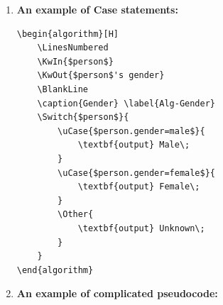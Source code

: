\documentclass[12pt,a4paper]{article}
\begin{document}
\begin{enumerate}
\begin{minipage}[t]{0.4\textwidth}
\begin{algorithm}[H]
                \textbf{output} $gcd$\;
            \end{algorithm}
        \end{minipage}

    \item {\color{blue}\textbf{An example of Case statements:}}

        \begin{minipage}[t]{0.5\textwidth}
\begin{verbatim}
\begin{algorithm}[H]
    \LinesNumbered
    \KwIn{$person$}
    \KwOut{$person$'s gender}
    \BlankLine
    \caption{Gender} \label{Alg-Gender}
    \Switch{$person$}{
        \uCase{$person.gender=male$}{
            \textbf{output} Male\;
        }
        \uCase{$person.gender=female$}{
            \textbf{output} Female\;
        }
        \Other{
            \textbf{output} Unknown\;
        }
    }
\end{algorithm}
\end{verbatim}
        \end{minipage}
        \hspace{2mm}
        \begin{minipage}[t]{0.4\textwidth}
            \begin{algorithm}[H]
                \LinesNumbered
                \BlankLine
                \caption{Gender} \label{Alg-Gender}
            \end{algorithm}
        \end{minipage}

    \item {\color{blue}\textbf{An example of complicated pseudocode:}}


\end{enumerate}
\end{document}
